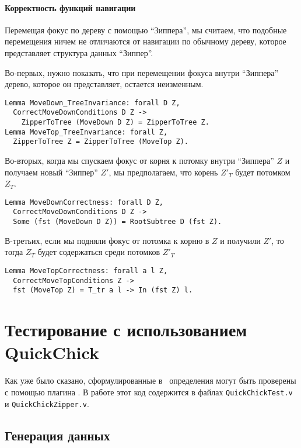 \paragraph{Корректность функций навигации}

Перемещая фокус по дереву с помощью ``Зиппера'', мы считаем, что подобные перемещения ничем не отличаются от навигации по обычному дереву, которое представляет структура данных ``Зиппер''.

Во-первых, нужно показать, что при перемещении фокуса внутри ``Зиппера'' дерево, которое он представляет, остается неизменным.

\begin{Verbatim}[fontsize=\small]
Lemma MoveDown_TreeInvariance: forall D Z,
  CorrectMoveDownConditions D Z ->
  	ZipperToTree (MoveDown D Z) = ZipperToTree Z.
Lemma MoveTop_TreeInvariance: forall Z,
  ZipperToTree Z = ZipperToTree (MoveTop Z).
\end{Verbatim}

Во-вторых, когда мы спускаем фокус от корня к потомку внутри ``Зиппера'' $Z$ и получаем новый ``Зиппер'' $Z'$, мы предполагаем, что корень $Z'_T$ будет потомком $Z_T$.  
\begin{Verbatim}[fontsize=\small]
Lemma MoveDownCorrectness: forall D Z,
  CorrectMoveDownConditions D Z ->
  Some (fst (MoveDown D Z)) = RootSubtree D (fst Z).
\end{Verbatim}

В-третьих, если мы подняли фокус от потомка к корню в $Z$ и получили $Z'$, то тогда $Z_T$ будет содержаться среди потомков $Z'_T$
\begin{Verbatim}[fontsize=\small]
Lemma MoveTopCorrectness: forall a l Z,
  CorrectMoveTopConditions Z ->
  fst (MoveTop Z) = T_tr a l -> In (fst Z) l.
\end{Verbatim}

\section{Тестирование с использованием QuickChick}

Как уже было сказано, сформулированные в \tcoq~определения могут быть проверены с помощью плагина \tqc. В работе этот код содержится в файлах \texttt{QuickChickTest.v} и \texttt{QuickChickZipper.v}.

\subsection{Генерация данных}

